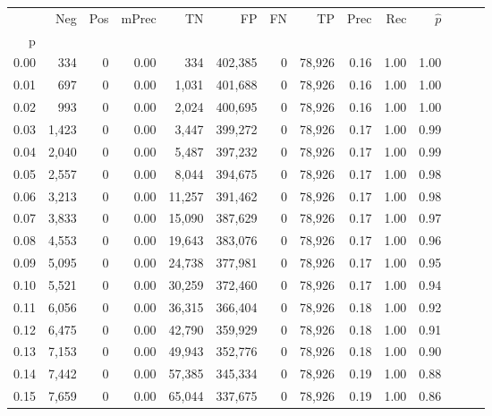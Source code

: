 \begin{tabular}{rrrrrrrrrrrrrr}
\toprule
{} &    Neg &    Pos & mPrec &       TN &       FP &      FN &      TP &  Prec &   Rec & $\hat{p}$ \\
p    &        &        &       &          &          &         &         &       &       &           \\
\midrule
0.00 &    334 &      0 &  0.00 &      334 &  402,385 &       0 &  78,926 &  0.16 &  1.00 &      1.00 \\
0.01 &    697 &      0 &  0.00 &    1,031 &  401,688 &       0 &  78,926 &  0.16 &  1.00 &      1.00 \\
0.02 &    993 &      0 &  0.00 &    2,024 &  400,695 &       0 &  78,926 &  0.16 &  1.00 &      1.00 \\
0.03 &  1,423 &      0 &  0.00 &    3,447 &  399,272 &       0 &  78,926 &  0.17 &  1.00 &      0.99 \\
0.04 &  2,040 &      0 &  0.00 &    5,487 &  397,232 &       0 &  78,926 &  0.17 &  1.00 &      0.99 \\
0.05 &  2,557 &      0 &  0.00 &    8,044 &  394,675 &       0 &  78,926 &  0.17 &  1.00 &      0.98 \\
0.06 &  3,213 &      0 &  0.00 &   11,257 &  391,462 &       0 &  78,926 &  0.17 &  1.00 &      0.98 \\
0.07 &  3,833 &      0 &  0.00 &   15,090 &  387,629 &       0 &  78,926 &  0.17 &  1.00 &      0.97 \\
0.08 &  4,553 &      0 &  0.00 &   19,643 &  383,076 &       0 &  78,926 &  0.17 &  1.00 &      0.96 \\
0.09 &  5,095 &      0 &  0.00 &   24,738 &  377,981 &       0 &  78,926 &  0.17 &  1.00 &      0.95 \\
0.10 &  5,521 &      0 &  0.00 &   30,259 &  372,460 &       0 &  78,926 &  0.17 &  1.00 &      0.94 \\
0.11 &  6,056 &      0 &  0.00 &   36,315 &  366,404 &       0 &  78,926 &  0.18 &  1.00 &      0.92 \\
0.12 &  6,475 &      0 &  0.00 &   42,790 &  359,929 &       0 &  78,926 &  0.18 &  1.00 &      0.91 \\
0.13 &  7,153 &      0 &  0.00 &   49,943 &  352,776 &       0 &  78,926 &  0.18 &  1.00 &      0.90 \\
0.14 &  7,442 &      0 &  0.00 &   57,385 &  345,334 &       0 &  78,926 &  0.19 &  1.00 &      0.88 \\
0.15 &  7,659 &      0 &  0.00 &   65,044 &  337,675 &       0 &  78,926 &  0.19 &  1.00 &      0.86 \\

\end{tabular}
